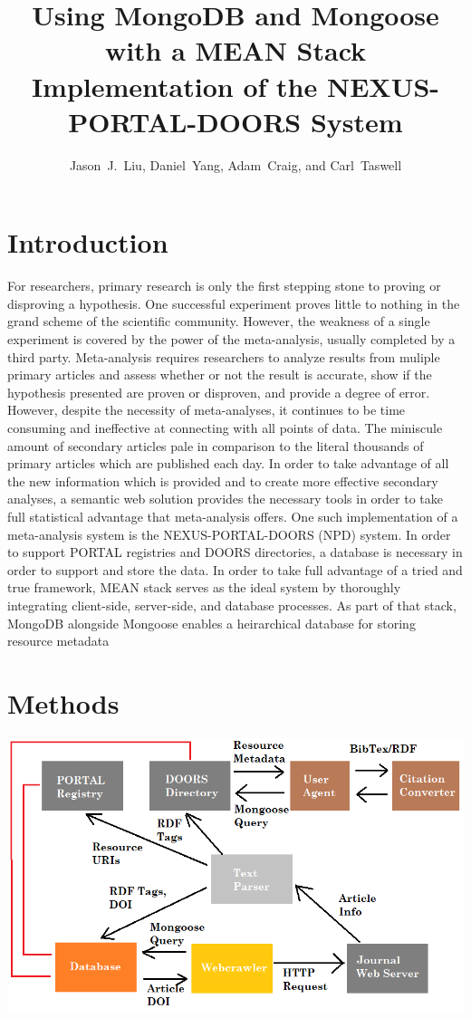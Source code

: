 \documentclass[10pt,twocolumn,twoside]{article}
\date{} %
\author{Jason~J.~Liu, Daniel~Yang, Adam~Craig, and Carl~Taswell}
\title{Using MongoDB and Mongoose with a MEAN Stack Implementation of the NEXUS-PORTAL-DOORS System\\ }
\begin{document}
\maketitle
\thispagestyle{empty}

\section*{Introduction}
\label{secIntroduction}
	For researchers, primary research is only the first stepping stone to proving or disproving a hypothesis. One successful experiment proves little to nothing in the grand scheme of the scientific community. However, the weakness of a single experiment is covered by the power of the meta-analysis, usually completed by a third party. Meta-analysis requires researchers to analyze results from muliple primary articles and assess whether or not the result is accurate, show if the hypothesis presented are proven or disproven, and provide a degree of error. However, despite the necessity of meta-analyses, it continues to be time consuming and ineffective at connecting with all points of data. The miniscule amount of secondary articles pale in comparison to the literal thousands of primary articles which are published each day. In order to take advantage of all the new information which is provided and to create more effective secondary analyses, a semantic web solution provides the necessary tools in order to take full statistical advantage that meta-analysis offers. 
 \newline
	One such implementation of a meta-analysis system is the NEXUS-PORTAL-DOORS (NPD) system. In order to support PORTAL registries and DOORS directories, a database is necessary in order to support and store the data. In order to take full advantage of a tried and true framework, MEAN stack serves as the ideal system by thoroughly integrating client-side, server-side, and database processes. As part of that stack, MongoDB alongside Mongoose enables a heirarchical database for storing resource metadata 

\section*{Methods}
\label{secMethods}
\includegraphics[scale=0.45]{NPDS_flowchart}	
\end{document}

